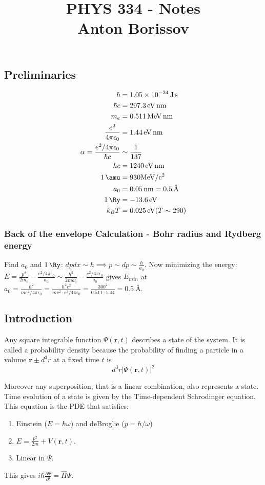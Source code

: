 \documentclass[11pt]{article}
\date{}
\title{\vspace{-3cm} PHYS 334 - Notes \\ \large Anton Borissov \vspace{-1cm} }
\author{}
\newcommand{\eps}{\epsilon}
\newcommand{\guillemot}[1]{\guillemotleft{#1}\guillemotright}
\renewcommand{\vec}[1]{\mathbf{#1}}
\newcommand{\FR}[2]{\frac{#1}{#2}}
\newcommand{\PP}[2]{\frac{\partial #1}{\partial #2}}
\theoremstyle{plain}
\theoremstyle{definition}
\theoremstyle{remark}
\def\bE{\begin{enumerate}}
\def\eE{\end{enumerate}}
\def\ii{\item}
\begin{document}
\subsection{Preliminaries}
\begin{align*}
\hbar   &= \SI{1.05e-34}{\joule\s}\\
\hbar c &= \SI{297.3}{\eV.\nm}\\
m_e     &= \SI{0.511}{\MeV.\nm}\\
\FR{e^2}{4\pi\eps_0} &= \SI{1.44}{\eV\nm}\\
\alpha = \FR{e^2/4\pi\eps_0}{\hbar c} &\sim \FR{1}{137}\\
hc &= \SI{1240}{\eV\nm}\\
\SI{1}{\amu} &= 930\si{MeV/c^2}\\
a_0 &= \SI{0.05}{\nm} = \SI{0.5}{\angstrom}\\
\SI{1}{\Ry} &= \SI{-13.6}{\eV}\\
k_B T &= \SI{0.025}{\eV} (T \sim 290)
\end{align*}

\subsubsection{Back of the envelope Calculation - Bohr radius and Rydberg energy}
Find $a_0$ and $\SI{1}{\Ry}$: $dpdx \sim \hbar \implies p \sim dp \sim
\FR{\hbar}{a_0}$. Now minimizing the energy: $E = \FR{p^2}{2m_e}-
\FR{e^2/4\pi\eps_0}{a_0} \sim \FR{\hbar^2}{2ma_0^2}-\FR{e^2/4\pi\eps_0}{a_0}$
gives $E_{min}$ at $a_0 = \FR{\hbar^2}{me^2/4\pi\eps_0}
= \FR{\hbar^2c^2}{mc^2 \cdot e^2/4\pi\eps_0}
= \FR{300^2}{0.511 \cdot 1.44}
= \SI{0.5}{\angstrom}$.

\subsection{Introduction}
Any square integrable function $\Psi(\vec r,t)$ describes a state of
the system. It is called a probability density because the probability
of finding a particle in a volume $\vec r \pm d^3 r$ at a fixed time $t$
is \[ d^3 r |\Psi(\vec r,t)|^2 \]

Moreover any superposition, that is a linear combination, also
represents a state. Time evolution of a state is given by the
Time-dependent Schrodinger equation. This equation is the
\guillemot{simplest} PDE that satisfies:
\bE
\ii Einstein ($E=\hbar \omega$) and deBroglie ($p=\hbar/\omega$)
\ii $E = \FR{p^2}{2m} + V(\vec r,t)$.
\ii Linear in $\Psi$.
\eE
This gives $i\hbar \PP{\Psi}{t} = \hat H\Psi$.
\end{document}
